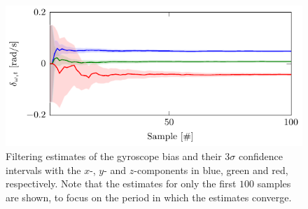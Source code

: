 \begin{figure}[t]
	\centering
    	\includegraphics[scale = 1]{figure5_1.pdf}
    	\caption{Filtering estimates of the gyroscope bias and their $3 \sigma$ confidence intervals with the $x$-, $y$- and $z$-components in blue, green and red, respectively. Note that the estimates for only the first $100$ samples are shown, to focus on the period in which the estimates converge.}
	\label{fig:calibration-filteringConv}
\end{figure}

